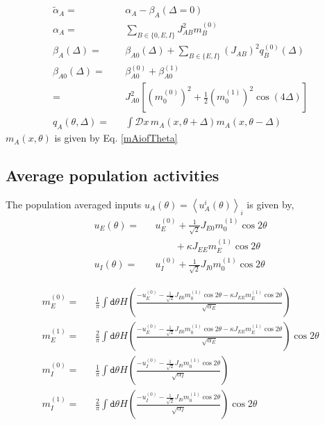 \documentclass[%
 reprint,
 amsmath,amssymb,
 aps,
]{revtex4-1}
\begin{document}
\begin{eqnarray}
\tilde{\alpha}_A =&& \alpha_A - \beta_A(\Delta = 0) \\ %
\alpha_{A} =&& \sum_{B \in \lbrace 0, E, I \rbrace} J_{AB}^2 m_B^{(0)} \\
\beta_{A}(\Delta) =&&  \beta_{A0} (\Delta) + \sum_{B \in \lbrace E, I \rbrace}  \left(J_{AB}\right)^2 q_B^{(0)}(\Delta) \\
\beta_{A0} (\Delta) =&& \beta_{A0}^{(0)} + \beta_{A0}^{(1)} \nonumber \\
=&& J^2_{A0} \left[ (m_0^{(0)})^2 + \frac{1}{2}(m_0^{(1)})^2  \cos(4\Delta) \right] \\
q_A (\theta, \Delta) =&& \int \mathcal{D} x \,  m_A(x, \theta + \Delta)  m_A(x, \theta - \Delta) 
\end{eqnarray}
$m_A(x, \theta)$ is given by Eq. \ref{mAiofTheta}

\subsection{Average population activities}

The population averaged inputs $u_A(\theta) = \left\langle u_A^i(\theta) \right\rangle_{i}$ is given by, 
\begin{eqnarray}
u_E(\theta) =&& u^{(0)}_E + \frac{1}{\sqrt{2}} J_{E0} m_0^{(1)} \cos 2 \theta \nonumber \\
\qquad&& \qquad+ \kappa J_{EE} m_E^{(1)} \cos 2 \theta \\
u_I(\theta) =&& u^{(0)}_I + \frac{1}{\sqrt{2}} J_{I0} m_0^{(1)} \cos 2 \theta 
\end{eqnarray}

\begin{widetext}
\begin{eqnarray}
m_E^{(0)} =&& \frac{1}{\pi} \int \mathtt{d} \theta H \left( \frac{-u^{(0)}_E - \frac{1}{\sqrt{2}} J_{E0} m_0^{(1)} \cos 2 \theta - \kappa  J_{EE} m_E^{(1)} \cos 2 \theta}{\sqrt{\alpha_E} } \right)  \label{me0} \\
m_E^{(1)} =&& \frac{2}{\pi} \int \mathtt{d} \theta H \left( \frac{-u^{(0)}_E - \frac{1}{\sqrt{2}} J_{E0} m_0^{(1)} \cos 2 \theta - \kappa  J_{EE} m_E^{(1)} \cos 2 \theta}{\sqrt{\alpha_E} } \right) \cos 2 \theta  \label{me1} \\
m_I^{(0)} =&& \frac{1}{\pi} \int \mathtt{d} \theta H \left( \frac{-u^{(0)}_I - \frac{1}{\sqrt{2}} J_{I0} m_0^{(1)} \cos 2 \theta}{\sqrt{\alpha_I} } \right)  \label{mi0} \\
m_I^{(1)} =&& \frac{2}{\pi} \int \mathtt{d} \theta H \left( \frac{-u^{(0)}_I - \frac{1}{\sqrt{2}} J_{I0} m_0^{(1)} \cos 2 \theta }{\sqrt{\alpha_I} } \right) \cos 2 \theta  \label{mi1}
\end{eqnarray}
\end{widetext}
\end{document}
